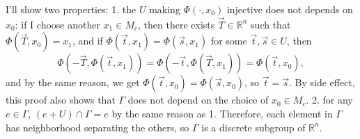 \documentclass[a4paper, 12pt]{article}
\theoremstyle{Mydefinition}
\theoremstyle{Mytheorem}
\begin{document}
I'll show two properties: 1. the $U$ making $\Phi(\cdot, x_0)$ injective does not depends on $x_0$: if I choose another $x_1\in M_c$, then there exists $\vec{T}\in\mathbb{R}^n$ such that $\Phi(\vec{T}, x_0) = x_1$, and if $\Phi(\vec{t}, x_1) = \Phi(\vec{s}, x_1)$ for some $\vec{t},\vec{s}\in U$, then 
\begin{equation*}
    \Phi(-\vec{T}, \Phi(\vec{t}, x_1)) = \Phi(-\vec{t}, \Phi(\vec{T}, x_1)) = \Phi(\vec{t}, x_0),
\end{equation*}
and by the same reason, we get $\Phi(\vec{t}, x_0) = \Phi(\vec{s}, x_0)$, so $\vec{t}=\vec{s}$. By side effect, this proof also shows that $\Gamma$ does not depend on the choice of $x_0\in M_c$. 2. for any $e\in \Gamma$, $(e+U)\cap \Gamma = e$ by the same reason as 1. Therefore, each element in $\Gamma$ has neighborhood separating the others, so $\Gamma$ is a discrete subgroup of $\mathbb{R}^n$.
\end{document}
